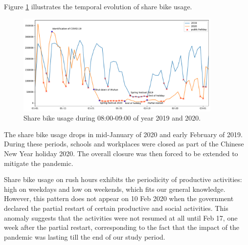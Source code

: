 \documentclass[ijgi,submit,moreauthors,pdftex]{Definitions/mdpi}
\begin{document}

Figure \ref{fig:hour_comparison_8} %
 illustrates the temporal evolution of share bike usage.

\begin{figure}[ht]
    \centering
    \includegraphics[width=0.9\textwidth]{Figures/hour_8-eps-converted-to.pdf}
    \caption{Share bike usage during 08:00-09:00 of year 2019 and 2020.}
    \label{fig:hour_comparison_8}
\end{figure}

The share bike usage drops in mid-January of 2020 and early February of 2019.
During these periods, schools and workplaces were closed as part of the Chinese New Year holiday 2020.
The overall closure was then forced to be extended to mitigate the pandemic.

Share bike usage on rush hours exhibits the periodicity of productive activities: high on weekdays and low on weekends, which fits our general knowledge.
However, this pattern does not appear on 10 Feb 2020 when the government declared the partial restart of certain productive and social activities.
This anomaly suggests that the activities were not resumed at all until Feb 17, one week after the partial restart, corresponding to the fact that the impact of the pandemic was lasting till the end of our study period.
\end{document}
